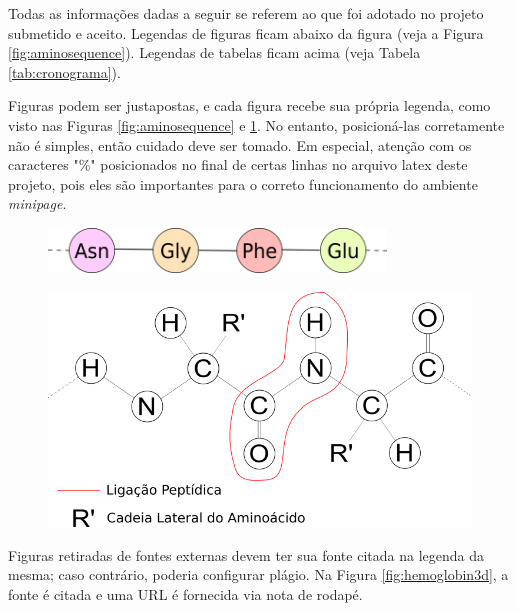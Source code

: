 
Todas as informações dadas a seguir se referem ao que foi adotado no projeto submetido e aceito. Legendas de figuras ficam abaixo da figura (veja a Figura \ref{fig:aminosequence}). Legendas de tabelas ficam acima (veja Tabela \ref{tab:cronograma}).

Figuras podem ser justapostas, e cada figura recebe sua própria legenda, como visto nas Figuras \ref{fig:aminosequence} e \ref{fig:peptidebond}. No entanto, posicioná-las corretamente não é simples, então cuidado deve ser tomado. Em especial, atenção com os caracteres "\%" posicionados no final de certas linhas no arquivo latex deste projeto, pois eles são importantes para o correto funcionamento do ambiente \textit{minipage}.

\begin{figure}[htb]
\centering
\begin{minipage}{.4\textwidth}
  \centering
  \vspace{1cm}
  \includegraphics[width=0.8\textwidth]{imagens/amino_seq.png}
  \vspace{1cm}
  \label{fig:aminosequence}
\end{minipage}%
\hspace{.04\textwidth}%
\begin{minipage}{.55\textwidth}
  \centering
  \includegraphics[width=0.8\linewidth]{imagens/protein_planar_pepbond.png}
  \label{fig:peptidebond}
\end{minipage}
\end{figure}

Figuras retiradas de fontes externas devem ter sua fonte citada na legenda da mesma; caso contrário, poderia configurar plágio. Na Figura \ref{fig:hemoglobin3d}, a fonte é citada e uma URL é fornecida via nota de rodapé.

